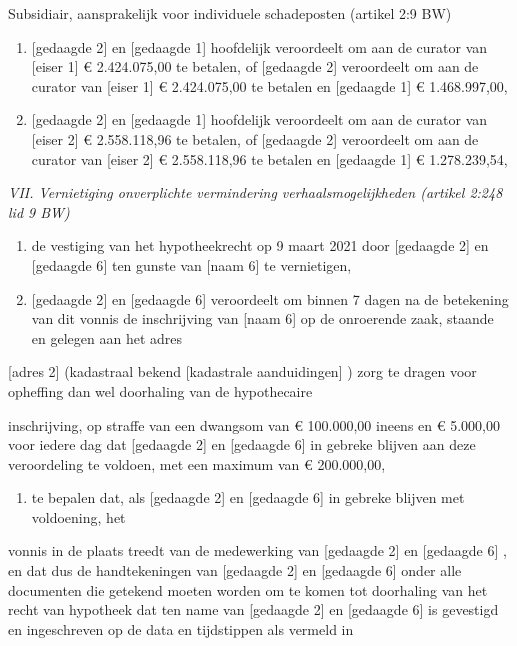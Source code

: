\documentclass[
  dutch,
  a4paper,
]{article}
\providecommand{\tightlist}{%
  \setlength{\itemsep}{0pt}\setlength{\parskip}{0pt}}
\begin{document}
Subsidiair, aansprakelijk voor individuele schadeposten (artikel 2:9 BW)

\begin{enumerate}
\def\labelenumi{\arabic{enumi}.}
\setcounter{enumi}{15}
\item
  {[}gedaagde 2{]} en {[}gedaagde 1{]} hoofdelijk veroordeelt om aan de curator van {[}eiser 1{]} € 2.424.075,00 te betalen, of {[}gedaagde 2{]} veroordeelt om aan de curator van {[}eiser 1{]} € 2.424.075,00 te betalen en {[}gedaagde 1{]} € 1.468.997,00,
\item
  {[}gedaagde 2{]} en {[}gedaagde 1{]} hoofdelijk veroordeelt om aan de curator van {[}eiser 2{]} € 2.558.118,96 te betalen, of {[}gedaagde 2{]} veroordeelt om aan de curator van {[}eiser 2{]} € 2.558.118,96 te betalen en {[}gedaagde 1{]} € 1.278.239,54,
\end{enumerate}

\emph{VII. Vernietiging onverplichte vermindering verhaalsmogelijkheden (artikel 2:248 lid 9 BW)}

\begin{enumerate}
\def\labelenumi{\arabic{enumi}.}
\setcounter{enumi}{17}
\item
  de vestiging van het hypotheekrecht op 9 maart 2021 door {[}gedaagde 2{]} en {[}gedaagde 6{]} ten gunste van {[}naam 6{]} te vernietigen,
\item
  {[}gedaagde 2{]} en {[}gedaagde 6{]} veroordeelt om binnen 7 dagen na de betekening van dit vonnis de inschrijving van {[}naam 6{]} op de onroerende zaak, staande en gelegen aan het adres
\end{enumerate}

{[}adres 2{]} (kadastraal bekend {[}kadastrale aanduidingen{]} ) zorg te dragen voor opheffing dan wel doorhaling van de hypothecaire

inschrijving, op straffe van een dwangsom van € 100.000,00 ineens en € 5.000,00 voor iedere dag dat {[}gedaagde 2{]} en {[}gedaagde 6{]} in gebreke blijven aan deze veroordeling te voldoen, met een maximum van € 200.000,00,

\begin{enumerate}
\def\labelenumi{\arabic{enumi}.}
\setcounter{enumi}{19}
\tightlist
\item
  te bepalen dat, als {[}gedaagde 2{]} en {[}gedaagde 6{]} in gebreke blijven met voldoening, het
\end{enumerate}

vonnis in de plaats treedt van de medewerking van {[}gedaagde 2{]} en {[}gedaagde 6{]} , en dat dus de handtekeningen van {[}gedaagde 2{]} en {[}gedaagde 6{]} onder alle documenten die getekend moeten worden om te komen tot doorhaling van het recht van hypotheek dat ten name van {[}gedaagde 2{]} en {[}gedaagde 6{]} is gevestigd en ingeschreven op de data en tijdstippen als vermeld in
\end{document}
